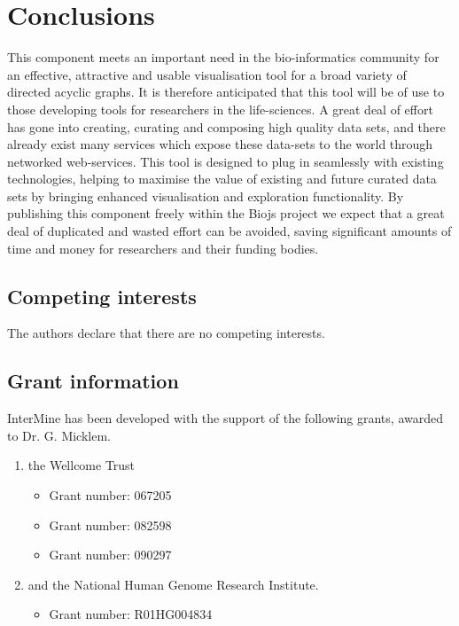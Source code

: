 \documentclass[10pt,a4paper,twocolumn]{article}
\begin{document}
\section*{Conclusions}
This component meets an important need in the bio-informatics community for an effective,
attractive and usable visualisation tool for a broad variety of directed acyclic graphs.
It is therefore anticipated that this tool will be of use to those developing tools
for researchers in the life-sciences. A great deal of effort has gone into creating,
curating and composing high quality data sets, and there already exist many services which
expose these data-sets to the world through networked web-services. This tool is designed to
plug in seamlessly with existing technologies, helping to maximise the value of existing
and future curated data sets by bringing enhanced visualisation and exploration functionality.
By publishing this component freely
within the Biojs project we expect that a great deal of duplicated
and wasted effort can be avoided, saving significant amounts of time and money for researchers and
their funding bodies.

\subsection*{Competing interests}
The authors declare that there are no competing interests.

\subsection*{Grant information}
InterMine has been developed with the support of the following grants, awarded
to Dr. G. Micklem.

\begin{enumerate}
\item the Wellcome Trust
 \begin{itemize}
 \item{Grant number: 067205}
 \item{Grant number: 082598}
 \item{Grant number: 090297}
 \end{itemize}
\item and the National Human Genome Research Institute.
 \begin{itemize}
 \item{Grant number: R01HG004834}
 \end{itemize}
\end{enumerate}
\end{document}
